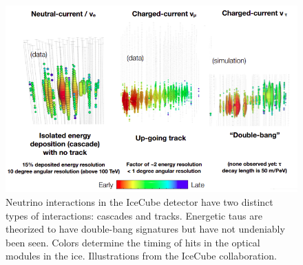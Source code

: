 \begin{figure}
\label{fig:ICinteractions}
\centering
\includegraphics[width=\textwidth]{chapter4/img/ICinteractions2.png}
\caption{Neutrino interactions in the IceCube detector have two distinct types of interactions: cascades and tracks. Energetic taus are theorized to have double-bang signatures but have not undeniably been seen. Colors determine the timing of hits in the optical modules in the ice. Illustrations from the IceCube collaboration.}
\end{figure}